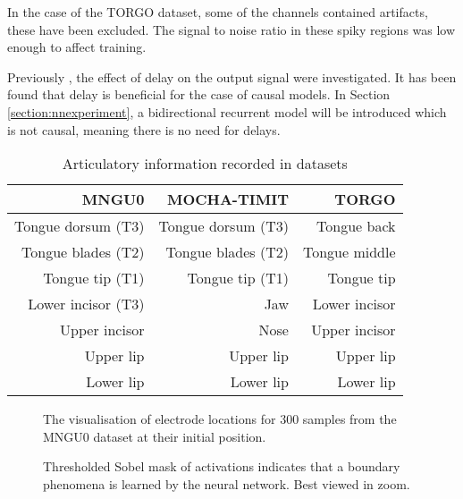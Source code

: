 \documentclass[a4paper]{article}
\begin{document}
In the case of the TORGO dataset, some of the channels contained artifacts,
these have been excluded. The signal to noise
ratio in these spiky regions was low enough to affect
training.

Previously \cite{Gonzalez2016}, the effect of delay on the
output signal were investigated. It has been found that delay
is beneficial for the case of causal models. In Section \ref{section:nnexperiment},
a bidirectional recurrent model will be introduced which is not causal, meaning there is no need for delays.

\begin{table}[th]
  \label{tab:electrodes}
  \centering
  \caption{Articulatory information recorded in datasets}
  \vspace{1em}
  \begin{tabular}{ r r r  }
    \toprule
    \textbf{MNGU0} & \textbf{MOCHA-TIMIT} & \textbf{TORGO} \\ 
    \midrule
    Tongue dorsum (T3) & Tongue dorsum (T3) & Tongue back \\
    Tongue blades (T2) & Tongue blades (T2) & Tongue middle \\
    Tongue tip (T1) & Tongue tip (T1) & Tongue tip \\
    Lower incisor (T3) & Jaw & Lower incisor\\
    Upper incisor & Nose & Upper incisor\\
    Upper lip & Upper lip & Upper lip \\
    Lower lip & Lower lip  & Lower lip\\
    \bottomrule
    \end{tabular}
\end{table}


\begin{figure}[t]
  \label{fig:electrodes}
  \begin{center}
    \scalebox{0.50}{}
\end{center}
  \caption{The visualisation of electrode locations for 300 samples from
    the MNGU0 dataset at their initial position.}
\end{figure}

\begin{figure}[t]
  \label{fig:mask}
  \begin{center}
    \scalebox{0.40}{}
\end{center}
  \caption{Thresholded Sobel mask of activations indicates that a boundary phenomena is learned by the neural network. Best viewed in zoom.}
\end{figure}
\end{document}
